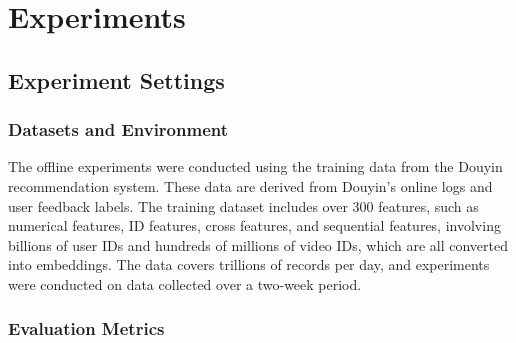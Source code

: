 \section{Experiments}
\label{sec:experiments}


\subsection{Experiment Settings}

\subsubsection{Datasets and Environment}

The offline experiments were conducted using the training data from the Douyin recommendation system. These data are derived from Douyin's online logs and user feedback labels. The training dataset includes over 300 features, such as numerical features, ID features, cross features, and sequential features, involving billions of user IDs and hundreds of millions of video IDs, which are all converted into embeddings. The data covers trillions of records per day, and experiments were conducted on data collected over a two-week period.

\subsubsection{Evaluation Metrics}

